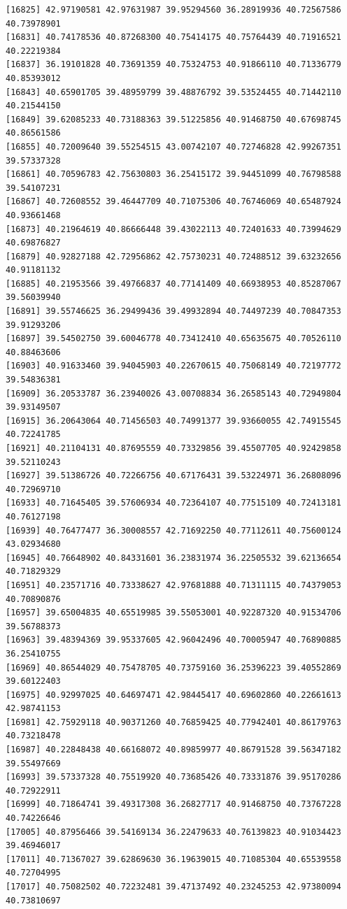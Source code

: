 \documentclass[
  letterpaper,
  DIV=11,
  numbers=noendperiod]{scrartcl}
\begin{document}
\begin{verbatim}
[16825] 42.97190581 42.97631987 39.95294560 36.28919936 40.72567586 40.73978901
[16831] 40.74178536 40.87268300 40.75414175 40.75764439 40.71916521 40.22219384
[16837] 36.19101828 40.73691359 40.75324753 40.91866110 40.71336779 40.85393012
[16843] 40.65901705 39.48959799 39.48876792 39.53524455 40.71442110 40.21544150
[16849] 39.62085233 40.73188363 39.51225856 40.91468750 40.67698745 40.86561586
[16855] 40.72009640 39.55254515 43.00742107 40.72746828 42.99267351 39.57337328
[16861] 40.70596783 42.75630803 36.25415172 39.94451099 40.76798588 39.54107231
[16867] 40.72608552 39.46447709 40.71075306 40.76746069 40.65487924 40.93661468
[16873] 40.21964619 40.86666448 39.43022113 40.72401633 40.73994629 40.69876827
[16879] 40.92827188 42.72956862 42.75730231 40.72488512 39.63232656 40.91181132
[16885] 40.21953566 39.49766837 40.77141409 40.66938953 40.85287067 39.56039940
[16891] 39.55746625 36.29499436 39.49932894 40.74497239 40.70847353 39.91293206
[16897] 39.54502750 39.60046778 40.73412410 40.65635675 40.70526110 40.88463606
[16903] 40.91633460 39.94045903 40.22670615 40.75068149 40.72197772 39.54836381
[16909] 36.20533787 36.23940026 43.00708834 36.26585143 40.72949804 39.93149507
[16915] 36.20643064 40.71456503 40.74991377 39.93660055 42.74915545 40.72241785
[16921] 40.21104131 40.87695559 40.73329856 39.45507705 40.92429858 39.52110243
[16927] 39.51386726 40.72266756 40.67176431 39.53224971 36.26808096 40.72969710
[16933] 40.71645405 39.57606934 40.72364107 40.77515109 40.72413181 40.76127198
[16939] 40.76477477 36.30008557 42.71692250 40.77112611 40.75600124 43.02934680
[16945] 40.76648902 40.84331601 36.23831974 36.22505532 39.62136654 40.71829329
[16951] 40.23571716 40.73338627 42.97681888 40.71311115 40.74379053 40.70890876
[16957] 39.65004835 40.65519985 39.55053001 40.92287320 40.91534706 39.56788373
[16963] 39.48394369 39.95337605 42.96042496 40.70005947 40.76890885 36.25410755
[16969] 40.86544029 40.75478705 40.73759160 36.25396223 39.40552869 39.60122403
[16975] 40.92997025 40.64697471 42.98445417 40.69602860 40.22661613 42.98741153
[16981] 42.75929118 40.90371260 40.76859425 40.77942401 40.86179763 40.73218478
[16987] 40.22848438 40.66168072 40.89859977 40.86791528 39.56347182 39.55497669
[16993] 39.57337328 40.75519920 40.73685426 40.73331876 39.95170286 40.72922911
[16999] 40.71864741 39.49317308 36.26827717 40.91468750 40.73767228 40.74226646
[17005] 40.87956466 39.54169134 36.22479633 40.76139823 40.91034423 39.46946017
[17011] 40.71367027 39.62869630 36.19639015 40.71085304 40.65539558 40.72704995
[17017] 40.75082502 40.72232481 39.47137492 40.23245253 42.97380094 40.73810697

\end{verbatim}
\end{document}
